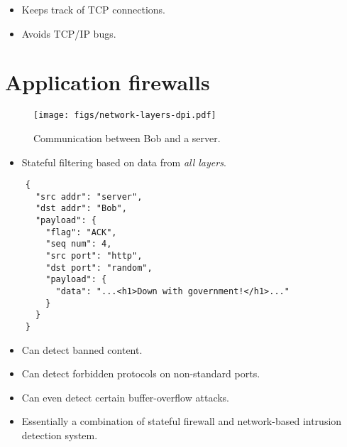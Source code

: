 \begin{frame}
  \begin{remark}
    \begin{itemize}
      \item Keeps track of TCP connections.
      \item Avoids TCP/IP bugs.
    \end{itemize}
  \end{remark}
\end{frame}


\section[DPI]{Application firewalls}

\begin{frame}
  \begin{figure}
    \texttt{[image: figs/network-layers-dpi.pdf]}
    \caption{Communication between Bob and a server.}
  \end{figure}
\end{frame}

\begin{frame}[fragile]
  \begin{definition}
    \begin{itemize}
      \item Stateful filtering based on data from \emph{all layers}.
    \end{itemize}
  \end{definition}
  \begin{verbatim}
    {
      "src addr": "server",
      "dst addr": "Bob",
      "payload": {
        "flag": "ACK",
        "seq num": 4,
        "src port": "http",
        "dst port": "random",
        "payload": {
          "data": "...<h1>Down with government!</h1>..."
        }
      }
    }
  \end{verbatim}
\end{frame}

\begin{frame}
  \begin{remark}
    \begin{itemize}
      \item Can detect banned content.
      \item Can detect forbidden protocols on non-standard ports.
      \item Can even detect certain buffer-overflow attacks.
      \item Essentially a combination of stateful firewall and network-based 
        intrusion detection system.
    \end{itemize}
  \end{remark}
\end{frame}

